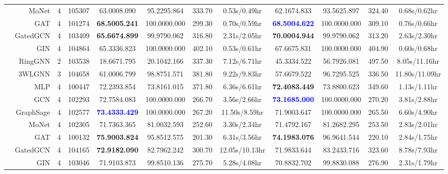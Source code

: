 \documentclass{article}
\newcommand{\best}[1]{{\color{red}\textbf{#1}}}
\begin{document}
\begin{table}[t]
{\begin{tabular}{crcc|cccc|cccc}
 \\
        \cline{2-12}
        & MoNet & 4 & 105307 & 63.0008.090 & 95.2295.864 & 333.70 & 0.53s/0.49hr & 62.1674.833 & 93.5625.897 & 324.40 & 0.68s/0.62hr \\
        & GAT & 4 & 101274 & \best{68.5005.241} & 100.0000.000 & 299.30 & 0.70s/0.59hr & \textcolor{blue}{\textbf{68.5004.622}} & 100.0000.000 & 309.10 & 0.76s/0.66hr \\
        & GatedGCN & 4 & 103409 & \textbf{65.6674.899} & 99.9790.062 & 316.80 & 2.31s/2.05hr & \best{70.0004.944} & 99.9790.062 & 313.20 & 2.63s/2.30hr \\
        \cline{2-12}
        & GIN & 4 & 104864 & 65.3336.823 & 100.0000.000 & 402.10 & 0.53s/0.61hr & 67.6675.831 & 100.0000.000 & 404.90 & 0.60s/0.68hr \\
        & RingGNN & 2 & 103538 & 18.6671.795 & 20.1042.166 & 337.30 & 7.12s/6.71hr & 45.3334.522 & 56.7926.081 & 497.50 & 8.05s/11.16hr \\
& 3WLGNN & 3 & 104658 & 61.0006.799 & 98.8751.571 & 381.80 & 9.22s/9.83hr & 57.6679.522 & 96.7295.525 & 336.50 & 11.80s/11.09hr\\
\midrule
        \parbox[t]{2mm}{} & MLP & 4 & 100447 & 72.2393.854 & 73.8161.015 & 371.80 & 6.36s/6.61hr & \textbf{72.4083.449} & 73.8800.623 & 349.60 & 1.13s/1.11hr\\
& GCN & 4 & 102293 & 72.7584.083 & 100.0000.000 & 266.70 & 3.56s/2.66hr & \textcolor{blue}{\textbf{73.1685.000}} & 100.0000.000 & 270.20 & 3.81s/2.88hr\\
& GraphSage & 4 & 102577 & \textcolor{blue}{\textbf{73.4333.429}} & 100.0000.000 & 267.20 & 11.50s/8.59hr & 71.9003.647 & 100.0000.000 & 265.50 & 6.60s/4.90hr \\
& MoNet & 4 & 102305 & 71.7363.365 & 81.0032.593 & 252.60 & 3.30s/2.34hr & 71.4792.167 & 81.2682.295 & 253.50 & 2.83s/2.01hr \\
& GAT & 4 & 100132 & \best{75.9003.824} & 95.8512.575 & 201.30 & 6.31s/3.56hr & \best{74.1983.076} & 96.9641.544 & 220.10 & 2.84s/1.75hr\\
        & GatedGCN & 4 & 104165 & \textbf{72.9182.090} & 82.7962.242 & 300.70 & 12.05s/10.13hr & 71.9833.644 & 83.2433.716 & 323.60 & 8.78s/7.93hr\\
        & GIN & 4 & 103046 & 71.9103.873 & 99.8510.136 & 275.70 & 5.28s/4.08hr & 70.8832.702 & 99.8830.088 & 276.90 & 2.31s/1.79hr\\

\end{tabular}}
\end{table}
\end{document}
